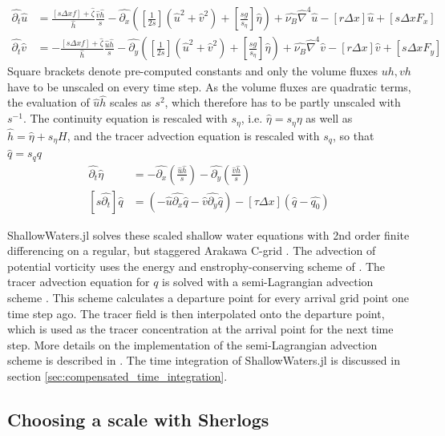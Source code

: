 \begin{align}
\hat{\partial_t}\hat{u} &= \frac{[s\Delta x f]+ \hat{\zeta}}{\hat{h}}\frac{\hat{v}\hat{h}}{s} -\hat{\partial_x}
\left([\frac{1}{2s}](\hat{u}^2 + \hat{v}^2) + [\frac{sg}{s_\eta}]\hat{\eta} \right) + \hat{\nu_B} \hat{\nabla}^4 \hat{u}
- [r\Delta x]\hat{u} + [s\Delta x F_x] \nonumber \\
\hat{\partial_t}\hat{v} &= - \frac{[s\Delta x f]+ \hat{\zeta}}{\hat{h}}\frac{\hat{u}\hat{h}}{s} -\hat{\partial_y}
\left([\frac{1}{2s}](\hat{u}^2 + \hat{v}^2) + [\frac{sg}{s_\eta}]\hat{\eta} \right) + \hat{\nu_B} \hat{\nabla}^4 \hat{v}
- [r\Delta x]\hat{v} + [s\Delta x F_y]
\end{align}
Square brackets denote pre-computed constants and only the volume fluxes $uh,vh$ have to be unscaled on every time step.
As the volume fluxes are quadratic terms, the evaluation of $\hat{u}\hat{h}$ scales as $s^2$, which therefore has to be
partly unscaled with $s^{-1}$. The continuity equation is rescaled with $s_\eta$, i.e. $\hat{\eta} = s_\eta \eta$ as well as
$\hat{h} = \hat{\eta} + s_\eta H$, and the tracer advection equation is rescaled with $s_q$, so that $\hat{q} = s_q q$
\begin{align}
\hat{\partial_t} \hat{\eta} &= -\hat{\partial_x}(\frac{\hat{u}\hat{h}}{s}) - \hat{\partial_y}(\frac{\hat{v}\hat{h}}{s}) \nonumber \\
[s\hat{\partial_t}] \hat{q} &= \left(-\hat{u}\hat{\partial_x} \hat{q} - \hat{v}\hat{\partial_y} \hat{q}\right) - [\tau \Delta x](\hat{q} - \hat{q_0})
\end{align}

ShallowWaters.jl solves these scaled shallow water equations with 2nd order finite differencing on a regular,
but staggered Arakawa C-grid \citep{Arakawa1977}. The advection of potential vorticity uses the energy
and enstrophy-conserving scheme of \cite{Arakawa1990}. The tracer advection equation for $q$ is solved
with a semi-Lagrangian advection scheme \citep{Diamantakis2013,Smolarkiewicz1992}. This scheme calculates
a departure point for every arrival grid point one time step ago. The tracer field is then interpolated onto the departure point,
which is used as the tracer concentration at the arrival point for the next time step. More details on the implementation of
the semi-Lagrangian advection scheme is described in \citep{Klower2020a}. The time integration of ShallowWaters.jl is
discussed in section \ref{sec:compensated_time_integration}.

\subsection{Choosing a scale with Sherlogs}
\label{sec:scale_sherlogs}

